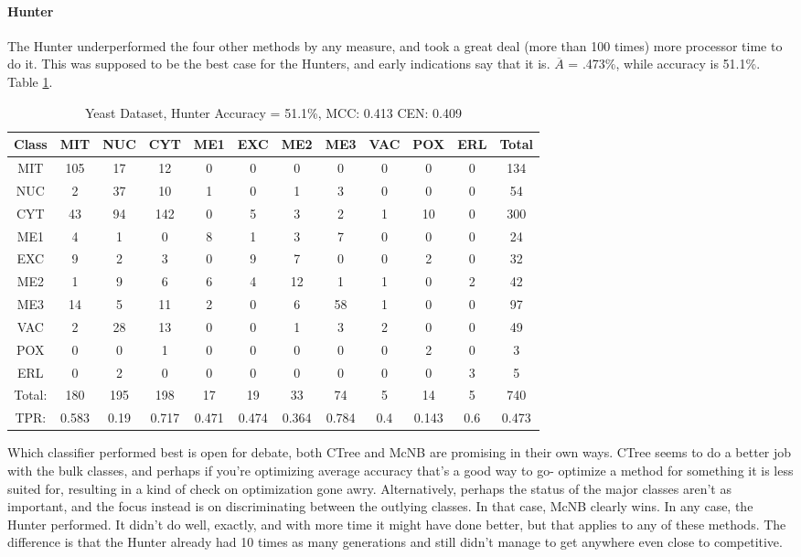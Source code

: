 	\paragraph{Hunter}
The Hunter underperformed the four other methods by any measure, and took a great deal (more than 100 times) more processor time to do it.  This was supposed to be the best case for the Hunters, and early indications say that it is.  $\overline{A}$ = .473\%, while accuracy is 51.1\%.  Table \ref{tab:yeasthunter}.
\\
\begin{table}[h!]
		\begin{tabular}{|c|c|c|c|c|c|c|c|c|c|c|c|}
		\hline
		Class&MIT&NUC&CYT&ME1&EXC&ME2&ME3&VAC&POX&ERL&Total\\
		\hline
MIT&105&17&12&0&0&0&0&0&0&0&134\\
NUC&2&37&10&1&0&1&3&0&0&0&54\\
CYT&43&94&142&0&5&3&2&1&10&0&300\\
ME1&4&1&0&8&1&3&7&0&0&0&24\\
EXC&9&2&3&0&9&7&0&0&2&0&32\\
ME2&1&9&6&6&4&12&1&1&0&2&42\\
ME3&14&5&11&2&0&6&58&1&0&0&97\\
VAC&2&28&13&0&0&1&3&2&0&0&49\\
POX&0&0&1&0&0&0&0&0&2&0&3\\
ERL&0&2&0&0&0&0&0&0&0&3&5\\
\hline
Total:&180&195&198&17&19&33&74&5&14&5&740\\
TPR:&0.583&0.19&0.717&0.471&0.474&0.364&0.784&0.4&0.143&0.6&0.473\\

		\hline
	\end{tabular}
	\caption[Yeast: Hunter]{Yeast Dataset, Hunter Accuracy = 51.1\%, MCC: 0.413 CEN: 0.409}
	\label{tab:yeasthunter}
\end{table}

Which classifier performed best is open for debate, both CTree and McNB are promising in their own ways.  CTree seems to do a better job with the bulk classes, and perhaps if you're optimizing average accuracy that's a good way to go- optimize a method for something it is less suited for, resulting in a kind of check on optimization gone awry.  Alternatively, perhaps the status of the major classes aren't as important, and the focus instead is on discriminating between the outlying classes.  In that case, McNB clearly wins.  In any case, the Hunter performed.  It didn't do well, exactly, and with more time it might have done better, but that applies to any of these methods.  The difference is that the Hunter already had 10 times as many generations and still didn't manage to get anywhere even close to competitive.

